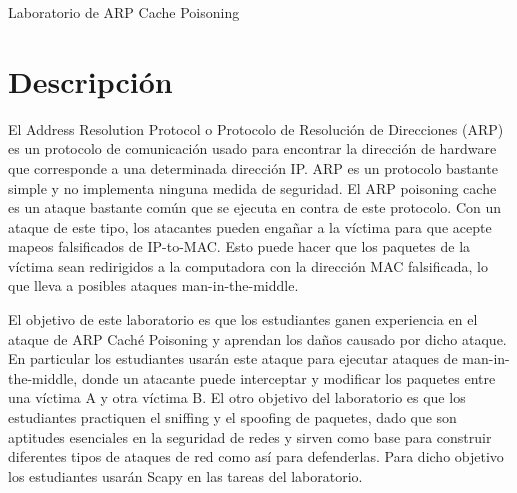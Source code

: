 
\newcommand{\commonfolder}{../../common-files}





\newcommand{\arpFigs}{./Figs}






\begin{center}
{\LARGE Laboratorio de ARP Cache Poisoning}
\end{center}



\section{Descripción}

El Address Resolution Protocol o Protocolo de Resolución de Direcciones (ARP) es un protocolo de comunicación usado para encontrar la dirección de hardware que corresponde a una determinada dirección IP. ARP es un protocolo bastante simple y no implementa ninguna medida de seguridad.
El ARP poisoning cache es un ataque bastante común que se ejecuta en contra de este protocolo.
Con un ataque de este tipo, los atacantes pueden engañar a la víctima para que acepte mapeos falsificados de IP-to-MAC. Esto puede hacer que los paquetes de la víctima sean redirigidos a la computadora con la dirección MAC falsificada, lo que lleva a posibles ataques man-in-the-middle.

El objetivo de este laboratorio es que los estudiantes ganen experiencia en el ataque de ARP Caché Poisoning y aprendan los daños causado por dicho ataque.
En particular los estudiantes usarán este ataque para ejecutar ataques de man-in-the-middle, donde un atacante puede interceptar y modificar los paquetes entre una víctima A y otra víctima B.
El otro objetivo del laboratorio es que los estudiantes practiquen el sniffing y el spoofing de paquetes, dado que son aptitudes esenciales en la seguridad de redes y sirven como base para construir diferentes tipos de ataques de red como así para defenderlas.
Para dicho objetivo los estudiantes usarán Scapy en las tareas del laboratorio.

